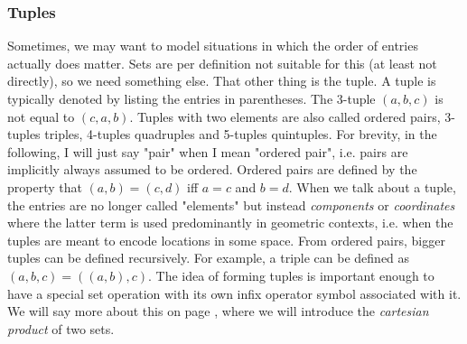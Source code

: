 \subsubsection{Tuples}
Sometimes, we may want to model situations in which the order of entries actually does matter. Sets are per definition not suitable for this (at least not directly), so we need something else. That other thing is the tuple. A tuple is typically denoted by listing the entries in parentheses. The 3-tuple $(a,b,c)$ is not equal to $(c,a,b)$. Tuples with two elements are also called ordered pairs, 3-tuples triples, 4-tuples quadruples and 5-tuples quintuples. For brevity, in the following, I will just say "pair" when I mean "ordered pair", i.e. pairs are implicitly always assumed to be ordered. Ordered pairs are defined by the property that $(a,b) = (c,d)$ iff $a = c$ and $b = d$. When we talk about a tuple, the entries are no longer called "elements" but instead \emph{components} or \emph{coordinates} where the latter term is used predominantly in geometric contexts, i.e. when the tuples are meant to encode locations in some space. From ordered pairs, bigger tuples can be defined recursively. For example, a triple can be defined as $(a,b,c) = ((a,b),c)$. The idea of forming tuples is important enough to have a special set operation with its own infix operator symbol associated with it. We will say more about this on page \pageref{Par:SetAlgebra}, where we will introduce the \emph{cartesian product} of two sets.

% 

